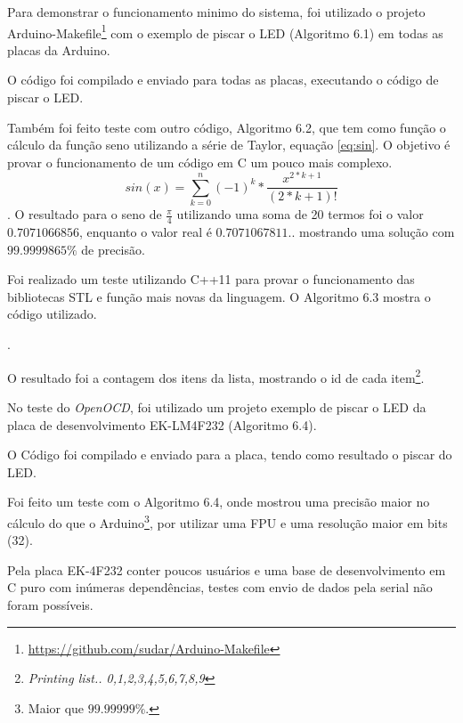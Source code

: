 Para demonstrar o funcionamento minimo do sistema, foi utilizado o projeto Arduino-Makefile\footnote{\url{https://github.com/sudar/Arduino-Makefile}} com o exemplo de piscar o LED (Algoritmo 6.1) em todas as placas da Arduino.



O código foi compilado e enviado para todas as placas, executando o código de piscar o LED.

Também foi feito teste com outro código, Algoritmo 6.2, que tem como função o cálculo da função seno utilizando a série de Taylor, equação \ref{eq:sin}. O objetivo é provar o funcionamento de um código em C um pouco mais complexo.
\begin{equation}
sin(x) = \sum_{k=0}^{n} (-1)^k * \frac{x^{2*k+1}}{(2*k+1)!}
\label{eq:sin} 
\end{equation}
.
O resultado para o seno de $\frac{\pi}{4}$ utilizando uma soma de 20 termos foi o valor $0.7071066856$, enquanto o valor real é $0.7071067811..$ mostrando uma solução com 
$99.9999865\%$ de precisão.

Foi realizado um teste utilizando C++11 para provar o funcionamento das bibliotecas STL e função mais novas da linguagem. O Algoritmo 6.3 mostra o código utilizado.

.

O resultado foi a contagem dos itens da lista, mostrando o id de cada item\footnote{\textit{Printing list.. 0,1,2,3,4,5,6,7,8,9}}.

No teste do \textit{OpenOCD}, foi utilizado um projeto exemplo de piscar o LED da placa de desenvolvimento EK-LM4F232 (Algoritmo 6.4).



O Código foi compilado e enviado para a placa, tendo como resultado o piscar do LED.

Foi feito um teste com o Algoritmo 6.4, onde mostrou uma precisão maior no cálculo do que o Arduino\footnote{Maior que $99.99999\%$.}, por utilizar uma FPU e uma resolução maior em bits (32).



Pela placa EK-4F232 conter poucos usuários e uma base de desenvolvimento em C puro com inúmeras dependências, testes com envio de dados pela serial não foram possíveis.

